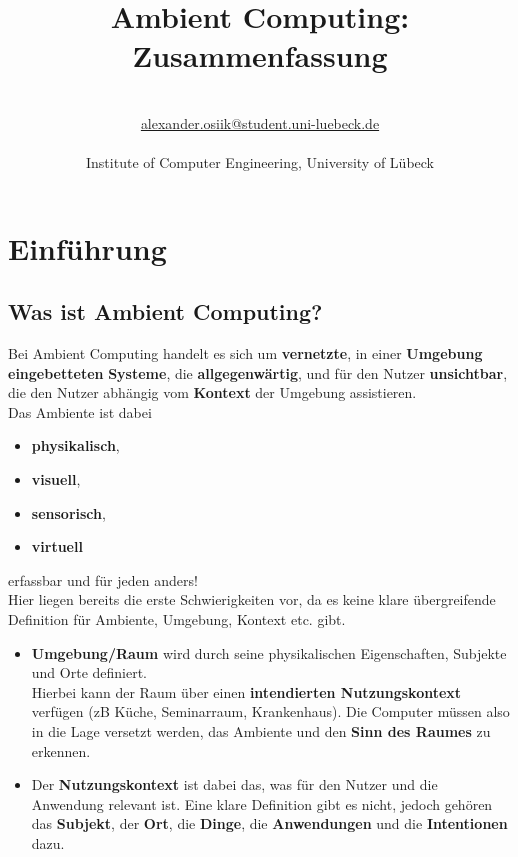 \documentclass[a4paper]{article}
\title{\textbf{Ambient Computing:\\ Zusammenfassung}}\let\Title\@title
\author{\AuthorName\\
	\href{mailto:alexander.osiik@student.uni-luebeck.de}{alexander.osiik@student.uni-luebeck.de}\\
	\small \seminar\\
	\small Institute of Computer Engineering, University of L\"ubeck\\
}\let\Author\@author
\begin{document}
	\maketitle	
\section{Einführung}
\subsection{Was ist Ambient Computing?}
Bei Ambient Computing handelt es sich um \textbf{vernetzte}, in einer \textbf{Umgebung} \textbf{eingebetteten} \textbf{Systeme}, die \textbf{allgegenwärtig}, und für den Nutzer \textbf{unsichtbar}, die den Nutzer abhängig vom \textbf{Kontext} der Umgebung assistieren. \\

Das Ambiente ist dabei
\begin{itemize}
	\item \textbf{physikalisch},
	\item \textbf{visuell}, 
	\item \textbf{sensorisch}, 
	\item \textbf{virtuell}
\end{itemize}
erfassbar und für jeden anders!\\

Hier liegen bereits die erste Schwierigkeiten vor, da es keine klare übergreifende Definition für Ambiente, Umgebung, Kontext etc. gibt.
\begin{itemize}
	\item \textbf{Umgebung/Raum} wird durch seine physikalischen Eigenschaften, Subjekte und Orte definiert.\\
	Hierbei kann der Raum über einen \textbf{intendierten Nutzungskontext} verfügen (zB Küche, Seminarraum, Krankenhaus). Die Computer müssen also in die Lage versetzt werden, das Ambiente und den \textbf{Sinn des Raumes} zu erkennen.
	\item Der \textbf{Nutzungskontext} ist dabei das, was für den Nutzer und die Anwendung relevant ist. Eine klare Definition gibt es nicht, jedoch gehören das \textbf{Subjekt}, der \textbf{Ort}, die \textbf{Dinge}, die \textbf{Anwendungen} und die \textbf{Intentionen} dazu.
\end{itemize} 
\end{document}
